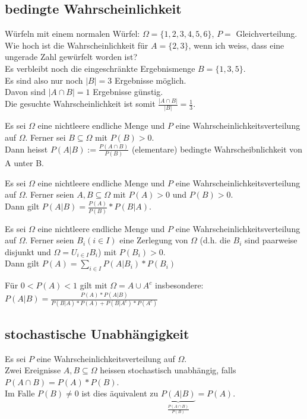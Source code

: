 \documentclass[10pt]{article}
\newtheorem[M]{definition}{Def.}
\newtheorem[M]{satz}{Satz}
\numberwithin{equation}{section}
\begin{document}
\subsection{bedingte Wahrscheinlichkeit}
Würfeln mit einem normalen Würfel: $\Omega = \{1,2,3,4,5,6\}$, $P=$ Gleichverteilung. Wie hoch ist die Wahrscheinlichkeit  für $A=\{2,3\}$, wenn ich weiss, dass eine ungerade Zahl gewürfelt worden ist? \\
Es verbleibt noch die eingeschränkte Ergebnismenge $B=\{1,3,5\}$. \\
Es sind also nur noch $|B|=3$ Ergebnisse möglich. \\
Davon sind $|A \cap B|=1$ Ergebnisse günstig. \\
Die gesuchte Wahrscheinlichkeit ist somit $\frac{|A \cap B|}{|B|} = \frac{1}{3}$.
\begin{definition}
Es sei $\Omega$ eine nichtleere endliche Menge und $P$ eine Wahrscheinlichkeitsverteilung auf $\Omega$. Ferner sei $B \subseteq \Omega$ mit $P(B) > 0$. \\
Dann heisst $P(A|B) := \frac{P(A \cap B)}{P(B)}$ (elementare) bedingte Wahrscheibnlichkeit von A unter B.
\end{definition} 
\begin{definition}
Es sei $\Omega$ eine nichtleere endliche Menge und $P$ eine Wahrscheinlichkeitsverteilung auf $\Omega$. Ferner seien $A,B \subseteq \Omega$ mit $P(A) > 0$ und $P(B) > 0$. \\
Dann gilt $P(A|B)=\frac{P(A)}{P(B)} * P(B | A)$.
\end{definition} 
\begin{definition}
Es sei $\Omega$ eine nichtleere endliche Menge und $P$ eine Wahrscheinlichkeitsverteilung auf $\Omega$. Ferner seien $B_i(i \in I)$ eine Zerlegung von $\Omega$ (d.h. die $B_i$ sind paarweise disjunkt und $\Omega=U_{i \in I} B_i$) mit $P(B_i) > 0$. \\
Dann gilt $P(A) = \sum_{i \in I} P(A | B_i) * P(B_i)$
\end{definition} 
\begin{definition}
Für $0 < P(A) < 1$ gilt mit $\Omega = A \cup A^c$ insbesondere: \\
$P(A | B) = \frac{P(A)*P(A | B)}{P(B | A) * P(A) + P(B | A^c) * P(A^c)}$
\end{definition} 

\subsection{stochastische Unabhängigkeit}
\begin{definition}
Es sei $P$ eine Wahrscheinlichkeitsverteilung auf $\Omega$. \\
Zwei Ereignisse $A,B \subseteq \Omega$ heissen stochastisch unabhängig, falls $P(A \cap B) = P(A) * P(B)$. \\
Im Falle $P(B) \neq 0$ ist dies äquivalent zu $\underbrace{P(A|B)}_{\frac{P(A \cap B)}{P(B)}}=P(A)$.
\end{definition} 
\end{document}
